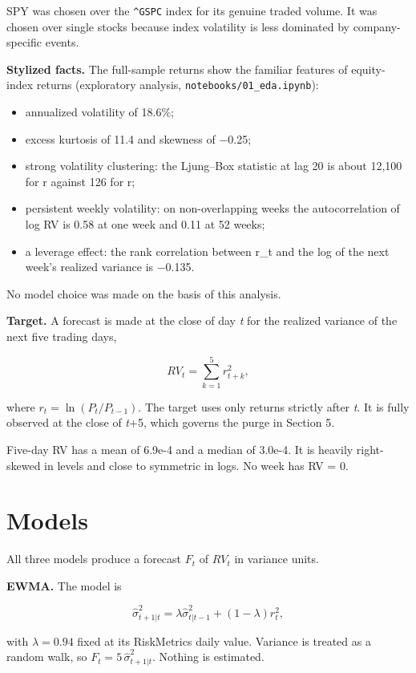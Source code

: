 \documentclass[11pt]{article}
\providecommand{\tightlist}{\setlength{\itemsep}{0pt}\setlength{\parskip}{0pt}}
\begin{document}
SPY was chosen over the \texttt{\^{}GSPC} index for its genuine traded volume. It was
chosen over single stocks because index volatility is less dominated by
company-specific events.

\textbf{Stylized facts.} The full-sample returns show the familiar features of
equity-index returns (exploratory analysis, \texttt{notebooks/01\_eda.ipynb}):

\begin{itemize}
\tightlist
\item
  annualized volatility of 18.6\%;
\item
  excess kurtosis of 11.4 and skewness of −0.25;
\item
  strong volatility clustering: the Ljung--Box statistic at lag 20 is
  about 12,100 for \textbar r\textbar{} against 126 for r;
\item
  persistent weekly volatility: on non-overlapping weeks the
  autocorrelation of log RV is 0.58 at one week and 0.11 at 52 weeks;
\item
  a leverage effect: the rank correlation between r\_t and the log of the
  next week's realized variance is −0.135.
\end{itemize}

No model choice was made on the basis of this analysis.

\textbf{Target.} A forecast is made at the close of day \emph{t} for the realized
variance of the next five trading days,

\[RV_t = \sum_{k=1}^{5} r_{t+k}^2 ,\]

where \(r_t = \ln(P_t / P_{t-1})\). The target uses only returns strictly
after \emph{t}. It is fully observed at the close of \emph{t}+5, which governs the
purge in Section 5.

Five-day RV has a mean of 6.9e-4 and a median of 3.0e-4. It is heavily
right-skewed in levels and close to symmetric in logs. No week has RV = 0.

\hypertarget{models}{%
\section{Models}\label{models}}

All three models produce a forecast \(F_t\) of \(RV_t\) in variance units.

\textbf{EWMA.} The model is

\[\hat\sigma^2_{t+1|t} = \lambda \hat\sigma^2_{t|t-1} + (1-\lambda) r_t^2 ,\]

with \(\lambda = 0.94\) fixed at its RiskMetrics daily value. Variance is
treated as a random walk, so \(F_t = 5\,\hat\sigma^2_{t+1|t}\). Nothing is
estimated.
\end{document}
